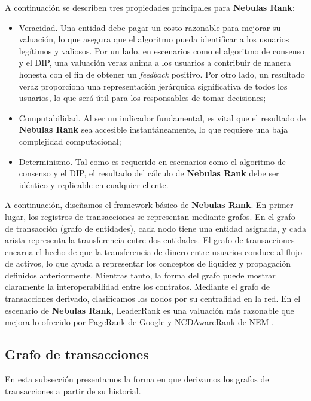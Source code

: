 A continuación se describen tres propiedades principales para \textbf{Nebulas Rank}:

\begin{itemize}

	\item Veracidad. Una entidad debe pagar un costo razonable para mejorar su valuación, lo que asegura que el algoritmo pueda identificar a los usuarios legítimos y valiosos. Por un lado, en escenarios como el algoritmo de consenso y el DIP, una valuación veraz anima a los usuarios a contribuir de manera honesta con el fin de obtener un \textit{feedback} positivo. Por otro lado, un resultado veraz proporciona una representación jerárquica significativa de todos los usuarios, lo que será útil para los responsables de tomar decisiones;

	\item Computabilidad. Al ser un indicador fundamental, es vital que el resultado de \textbf{Nebulas Rank} sea accesible instantáneamente, lo que requiere una baja complejidad computacional;

	\item Determinismo. Tal como es requerido en escenarios como el algoritmo de consenso y el DIP, el resultado del cálculo de \textbf{Nebulas Rank} debe ser idéntico y replicable en cualquier cliente.

\end{itemize}

A continuación, diseñamos el framework básico de \textbf{Nebulas Rank}. En primer lugar, los registros de transacciones se representan mediante grafos. En el grafo de transacción (grafo de entidades), cada nodo tiene una entidad asignada, y cada arista representa la transferencia entre dos entidades\cite{Tschorsch2015}. El grafo de transacciones encarna el hecho de que la transferencia de dinero entre usuarios conduce al flujo de activos, lo que ayuda a representar los conceptos de liquidez y propagación definidos anteriormente. Mientras tanto, la forma del grafo puede mostrar claramente la interoperabilidad entre los contratos. Mediante el grafo de transacciones derivado, clasificamos los nodos por su centralidad en la red. En el escenario de \textbf{Nebulas Rank}, LeaderRank \cite{Chen2013}\cite{Li2014} es una valuación más razonable que mejora lo ofrecido por PageRank de Google y NCDAwareRank de NEM \cite{nem}.

\subsection{Grafo de transacciones} \label{subsec:txg}
En esta subsección presentamos la forma en que derivamos los grafos de transacciones a partir de su historial.

